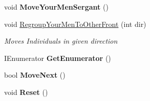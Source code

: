 \begin{DoxyCompactItemize}
\item 
\hypertarget{class_music_population_1_1_area_manager_a2429a1af1ec0f63206688874845fc314}{void {\bfseries Move\+Your\+Men\+Sergant} ()}\label{class_music_population_1_1_area_manager_a2429a1af1ec0f63206688874845fc314}

\item 
void \hyperlink{class_music_population_1_1_area_manager_ac42aef4ec8c4a3789b9e94bf40f31b04}{Regroup\+Your\+Men\+To\+Other\+Front} (int dir)
\begin{DoxyCompactList}\small\item\em Moves Individuals in given direction \end{DoxyCompactList}\item 
\hypertarget{class_music_population_1_1_area_manager_a6acfc222bc4baa96a6f3a32b9e154cc3}{I\+Enumerator {\bfseries Get\+Enumerator} ()}\label{class_music_population_1_1_area_manager_a6acfc222bc4baa96a6f3a32b9e154cc3}

\item 
\hypertarget{class_music_population_1_1_area_manager_ab91f224fd25e2ae5715496c881a2c90a}{bool {\bfseries Move\+Next} ()}\label{class_music_population_1_1_area_manager_ab91f224fd25e2ae5715496c881a2c90a}

\item 
\hypertarget{class_music_population_1_1_area_manager_a2639a5ef9ebb562d9bd1dcfd2c0f83e3}{void {\bfseries Reset} ()}\label{class_music_population_1_1_area_manager_a2639a5ef9ebb562d9bd1dcfd2c0f83e3}

\end{DoxyCompactItemize}
